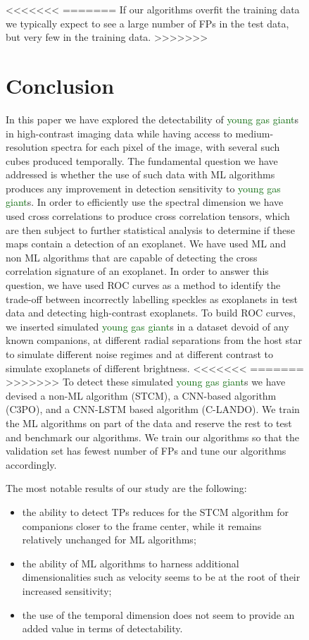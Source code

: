\documentclass{aa}
\newcommand{\newchange}[1]{\textcolor{darkgreen}{#1}}
\begin{document}
{{{\begin{figure}
{<<<<<<<
=======
If our algorithms overfit the training data we typically expect to see a large number of FPs in the test data, but very few in the training data. 
>>>>>>>
\section{Conclusion}

In this paper we have explored the detectability of \newchange{young gas giant}s in high-contrast imaging data while having access to medium-resolution spectra for each pixel of the image, with several such cubes produced temporally.
The fundamental question we have addressed is whether the use of such data with ML algorithms produces any improvement in detection sensitivity to \newchange{young gas giant}s.
In order to efficiently use the spectral dimension we have used cross correlations to produce cross correlation tensors, which are then subject to further statistical analysis to determine if these maps contain a detection of an exoplanet.
We have used ML and non ML algorithms that are capable of detecting the cross correlation signature of an exoplanet. %
In order to answer this question, we have used ROC curves as a method to identify the trade-off between incorrectly labelling speckles as exoplanets in test data and detecting high-contrast exoplanets.
To build ROC curves, we inserted simulated \newchange{young gas giant}s in a dataset devoid of any known companions, at different radial separations from the host star to simulate different noise regimes and at different contrast to simulate exoplanets of different brightness.
<<<<<<<
=======
>>>>>>>
To detect these simulated \newchange{young gas giant}s we have devised a non-ML algorithm (STCM), a CNN-based algorithm (C3PO), and a CNN-LSTM based algorithm (C-LANDO). 
We train the ML algorithms on part of the data and reserve the rest to test and benchmark our algorithms. 
We train our algorithms so that the validation set has fewest number of FPs and tune our algorithms accordingly. 

The most notable results of our study are the following:
\begin{itemize}
    \item the ability to detect TPs reduces for the STCM algorithm for companions closer to the frame center, while it remains relatively unchanged for ML algorithms;
    \item the ability of ML algorithms to harness additional dimensionalities such as velocity seems to be at the root of their increased sensitivity;
    \item the use of the temporal dimension does not seem to provide an added value in terms of detectability.%
\end{itemize}

}
\end{figure}}}}
\end{document}
